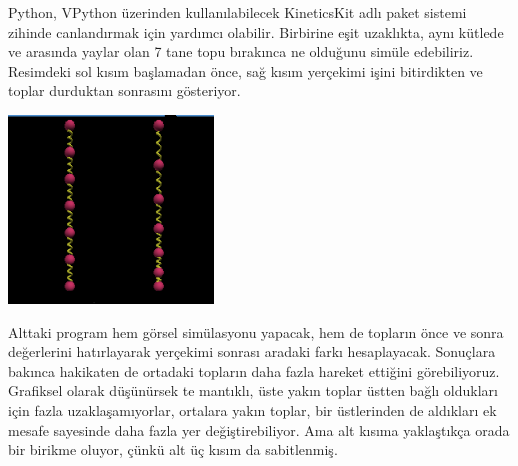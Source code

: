 \documentclass[12pt,fleqn]{article}\usepackage{../../common}
\begin{document}
Python, VPython üzerinden kullanılabilecek KineticsKit adlı paket sistemi
zihinde canlandırmak için yardımcı olabilir. Birbirine eşit uzaklıkta, aynı
kütlede ve arasında yaylar olan 7 tane topu bırakınca ne olduğunu simüle
edebiliriz. Resimdeki sol kısım başlamadan önce, sağ kısım yerçekimi işini
bitirdikten ve toplar durduktan sonrasını gösteriyor.

\includegraphics[height=5cm]{elastic_uniform_load.png}

Alttaki program hem görsel simülasyonu yapacak, hem de topların önce ve
sonra değerlerini hatırlayarak yerçekimi sonrası aradaki farkı
hesaplayacak. Sonuçlara bakınca hakikaten de ortadaki topların daha fazla
hareket ettiğini görebiliyoruz. Grafiksel olarak düşünürsek te mantıklı,
üste yakın toplar üstten bağlı oldukları için fazla uzaklaşamıyorlar,
ortalara yakın toplar, bir üstlerinden de aldıkları ek mesafe sayesinde
daha fazla yer değiştirebiliyor. Ama alt kısıma yaklaştıkça orada bir
birikme oluyor, çünkü alt üç kısım da sabitlenmiş. 

\inputminted[fontsize=\footnotesize]{python}{elastic_uniform_load.py}
\end{document}
